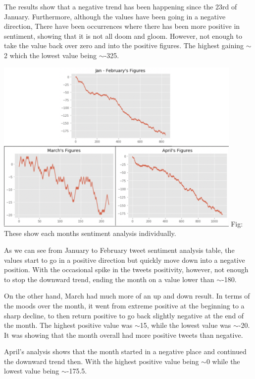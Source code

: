 \documentclass[a4paper,10pt]{article}
\begin{document}
	The results show that a negative trend has been happening since the 23rd of January. Furthermore, although the values have been going in a negative direction, There have been occurrences where there has been more positive in sentiment, showing that it is not all doom and gloom. However, not enough to take the value back over zero and into the positive figures. The highest gaining $\sim$2 which the lowest value being $\sim$-325.
	
	\begin{center}
		\label{confusion_matrix}
		\includegraphics[width=12cm]{eachmonth3.png}
		Fig:  These show each months sentiment analysis individually.
	\end{center}

	As we can see from January to February tweet sentiment analysis table, the values start to go in a positive direction but quickly move down into a negative position. With the occasional spike in the tweets positivity, however, not enough to stop the downward trend, ending the month on a value lower than $\sim$-180. 
	
	On the other hand, March had much more of an up and down result. In terms of the moods over the month, it went from extreme positive at the beginning to a sharp decline, to then return positive to go back slightly negative at the end of the month. The highest positive value was $\sim$15, while the lowest value was $\sim$-20. It was showing that the month overall had more positive tweets than negative.
	
	April's analysis shows that the month started in a negative place and continued the downward trend then. With the highest positive value being $\sim$0 while the lowest value being $\sim$-175.5.
	
\end{document}
